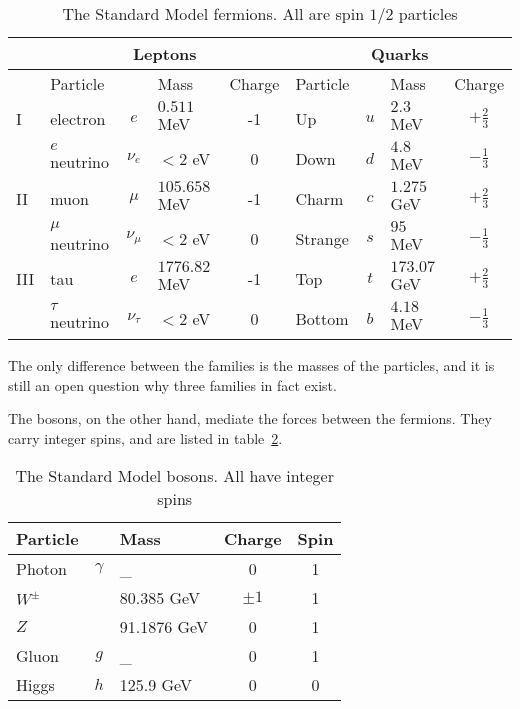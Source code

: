 \begin{table}[H]
	\centering
	\begin{tabular}{l l c l c l c l c}
		& \multicolumn{4}{c}{Leptons} & \multicolumn{4}{c}{Quarks} \\
		\hline\hline
		    & Particle        &              & Mass          & Charge & Particle &     & Mass         & Charge         \\
		\hline\hline
		I   & electron        & $e$          & $0.511$ MeV   & -1     & Up       & $u$ & $2.3$ MeV    & $+\frac{2}{3}$ \\
		    & $e$ neutrino    & $\nu_e$      & $<2$ eV       & 0      & Down     & $d$ & $4.8$ MeV    & $-\frac{1}{3}$ \\
		\hline
		II  & muon            & $\mu$        & $105.658$ MeV & -1     & Charm    & $c$ & $1.275$ GeV  & $+\frac{2}{3}$ \\
		    & $\mu$ neutrino  & $\nu_{\mu}$  & $<2$ eV       & 0      & Strange  & $s$ & $95$ MeV     & $-\frac{1}{3}$ \\
		\hline
		III & tau             & $e$          & $1776.82$ MeV & -1     & Top      & $t$ & $173.07$ GeV & $+\frac{2}{3}$ \\
		    & $\tau$ neutrino & $\nu_{\tau}$ & $<2$ eV       & 0      & Bottom   & $b$ & $4.18$ MeV   & $-\frac{1}{3}$ \\
		\hline
	\end{tabular}
	\caption{The Standard Model fermions. All are spin $1/2$ particles}
	\label{t:smfparticles}
\end{table}

The only difference between the families is the masses of the particles, and it
is still an open question why three families in fact exist.

The bosons, on the other hand, mediate the forces between the fermions. They
carry integer spins, and are listed in table~\ref{t:smbparticles}.

\begin{table}[H]
	\centering
	\begin{tabular}{l c l c c}
		Particle  &          & Mass        & Charge  & Spin \\
		\hline\hline
		Photon    & $\gamma$ & \_          & 0       & 1    \\
		$W^{\pm}$ &          & 80.385 GeV  & $\pm 1$ & 1    \\
		$Z$       &          & 91.1876 GeV & 0       & 1    \\
		Gluon     & $g$      & \_          & 0       & 1    \\
		Higgs     & $h$      & 125.9 GeV   & 0       & 0    \\
		\hline
	\end{tabular}
	\caption{The Standard Model bosons. All have integer spins}
	\label{t:smbparticles}
\end{table}


